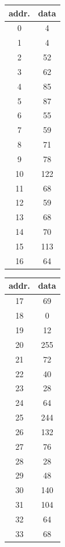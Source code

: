 \documentclass{article}
\begin{document}
\begin{figure}[ht]
    \hspace{-10pt}
    \begin{minipage}[c]{.35\linewidth}
    \centering 
    \begin{tabular}{c|c}
        addr. & data \\
        \hline \hline
        0  & 4   \\
        1  & 4   \\
        2  & 52  \\
        3  & 62  \\
        4  & 85  \\
        5  & 87  \\
        6  & 55  \\
        7  & 59  \\
        8  & 71  \\
        9  & 78  \\
        10 & 122 \\
        11 & 68  \\
        12 & 59  \\
        13 & 68  \\
        14 & 70  \\
        15 & 113 \\
        16 & 64  \\
       \end{tabular}
    \begin{tabular}{c|c}
        addr. & data \\
        \hline \hline
        17 & 69  \\
        18 & 0   \\
        19 & 12  \\
        20 & 255 \\
        21 & 72  \\
        22 & 40  \\
        23 & 28  \\
        24 & 64  \\
        25 & 244 \\
        26 & 132 \\
        27 & 76  \\
        28 & 28  \\
        29 & 48  \\
        30 & 140 \\
        31 & 104 \\
        32 & 64  \\
        33 & 68  \\

\end{tabular}
\end{minipage}
\end{figure}
\end{document}
